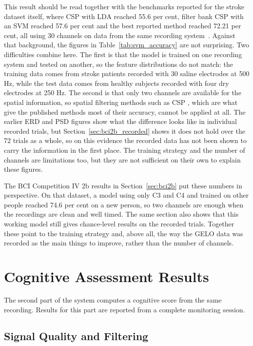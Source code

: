 This result should be read together with the benchmarks reported for the stroke dataset
itself, where CSP with LDA reached 55.6 per cent, filter bank CSP with an SVM reached 57.6
per cent and the best reported method reached 72.21 per cent, all using 30 channels on data
from the same recording system~\cite{liu2024mi}. Against that background, the figures in
Table~\ref{tab:svm_accuracy} are not surprising. Two difficulties combine here. The first
is that the model is trained on one recording system and tested on another, so the feature
distributions do not match: the training data comes from stroke patients recorded with 30
saline electrodes at 500 Hz, while the test data comes from healthy subjects recorded with
four dry electrodes at 250 Hz. The second is that only two channels are available for the
spatial information, so spatial filtering methods such as CSP \cite{ramoser2000csp}, which are what give the
published methods most of their accuracy, cannot be applied at all. The earlier ERD and PSD
figures show what the difference looks like in individual recorded trials, but
Section~\ref{sec:bci2b_recorded} shows it does not hold over the 72 trials as a whole, so
on this evidence the recorded data has not been shown to carry the information in the
first place. The training strategy and the number of channels are limitations too, but
they are not sufficient on their own to explain these figures.

The BCI Competition IV 2b results in Section~\ref{sec:bci2b} put these numbers in
perspective. On that dataset, a model using only C3 and C4 and trained on other people
reached 74.6 per cent on a new person, so two channels are enough when the recordings are
clean and well timed. The same section also shows that this working model still gives
chance-level results on the recorded trials. Together these point to the training
strategy and, above all, the way the GELO data was recorded as the main things to
improve, rather than the number of channels.

\FloatBarrier

\section{Cognitive Assessment Results}

The second part of the system computes a cognitive score from the same recording. Results
for this part are reported from a complete monitoring session.

\subsection{Signal Quality and Filtering}

